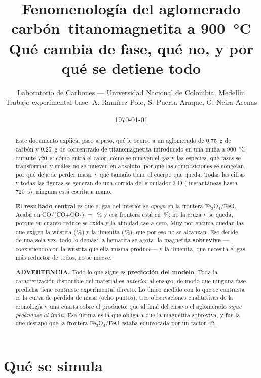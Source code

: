 \documentclass[11pt,a4paper]{article}
\title{\vspace{-1.5cm}Fenomenología del aglomerado carbón--titanomagnetita
a \SI{900}{\celsius}\\
\large Qué cambia de fase, qué no, y por qué se detiene todo}
\author{Laboratorio de Carbones --- Universidad Nacional de Colombia, Medellín\\
\small Trabajo experimental base: A. Ramírez Polo, S. Puerta Araque, G. Neira Arenas}
\date{\today}
\newcommand{\ojo}[1]{\textcolor{aviso}{\textbf{#1}}}
\begin{document}
\maketitle

\begin{abstract}
\noindent
Este documento explica, paso a paso, qué le ocurre a un aglomerado de
\SI{0.75}{\gram} de carbón y \SI{0.25}{\gram} de concentrado de titanomagnetita
introducido en una mufla a \SI{900}{\celsius} durante \SI{720}{\second}: cómo
entra el calor, cómo se mueven el gas y las especies, qué fases se transforman y
cuáles no se mueven en absoluto, por qué las composiciones se congelan, por qué
deja de perder masa, y qué tamaño tiene el cuerpo que queda. Todas las cifras y
todas las figuras se generan de una corrida del simulador 3-D
(\datNFotogramas{} instantáneas hasta \SI{720}{\second});
ninguna está escrita a mano.
\medskip

\noindent
\ojo{El resultado central} es que el gas del interior se \emph{apoya} en la
frontera Fe$_3$O$_4$/FeO. Acaba en CO/(CO+CO$_2$) $=$ \datGas{}\,\% y esa
frontera está en \datUmbralMagnetita{}\,\%: no la cruza y se queda, porque en
cuanto reduce se oxida y la afinidad cae a cero. Muy por encima quedan las que
exigen la wüstita (\datUmbralWustita{}\,\%) y la ilmenita
(\datUmbralIlmenita{}\,\%), que por eso no se alcanzan. Eso decide, de una sola
vez, todo lo demás: la hematita se agota, la magnetita \textbf{sobrevive}
---coexistiendo con la wüstita que ella misma produce--- y la ilmenita, que
necesita el gas más reductor de todos, no se mueve.
\medskip

\noindent
\ojo{ADVERTENCIA.} Todo lo que sigue es \textbf{predicción del modelo}. Toda la
caracterización disponible del material es \emph{anterior} al ensayo, de modo
que ninguna fase predicha tiene contraste experimental directo. Lo único medido
con lo que se contrasta es la curva de pérdida de masa (ocho puntos), tres
observaciones cualitativas de la cronología y una cuarta sobre el producto: que
al final del ensayo el aglomerado \emph{sigue pegándose al imán}. Esa última es
la que obliga a que la magnetita sobreviva, y fue la que destapó que la frontera
Fe$_3$O$_4$/FeO estaba equivocada por un factor 42.
\end{abstract}

\tableofcontents
\bigskip

\section{Qué se simula}
\end{document}
